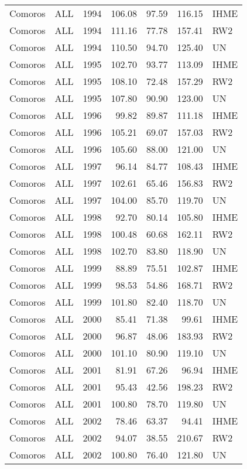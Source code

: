 \begin{longtable}{lllrrrl}
  Comoros & ALL & 1994 & 106.08 & 97.59 & 116.15 & IHME \\ 
  Comoros & ALL & 1994 & 111.16 & 77.78 & 157.41 & RW2 \\ 
  Comoros & ALL & 1994 & 110.50 & 94.70 & 125.40 & UN \\ 
  Comoros & ALL & 1995 & 102.70 & 93.77 & 113.09 & IHME \\ 
  Comoros & ALL & 1995 & 108.10 & 72.48 & 157.29 & RW2 \\ 
  Comoros & ALL & 1995 & 107.80 & 90.90 & 123.00 & UN \\ 
  Comoros & ALL & 1996 & 99.82 & 89.87 & 111.18 & IHME \\ 
  Comoros & ALL & 1996 & 105.21 & 69.07 & 157.03 & RW2 \\ 
  Comoros & ALL & 1996 & 105.60 & 88.00 & 121.00 & UN \\ 
  Comoros & ALL & 1997 & 96.14 & 84.77 & 108.43 & IHME \\ 
  Comoros & ALL & 1997 & 102.61 & 65.46 & 156.83 & RW2 \\ 
  Comoros & ALL & 1997 & 104.00 & 85.70 & 119.70 & UN \\ 
  Comoros & ALL & 1998 & 92.70 & 80.14 & 105.80 & IHME \\ 
  Comoros & ALL & 1998 & 100.48 & 60.68 & 162.11 & RW2 \\ 
  Comoros & ALL & 1998 & 102.70 & 83.80 & 118.90 & UN \\ 
  Comoros & ALL & 1999 & 88.89 & 75.51 & 102.87 & IHME \\ 
  Comoros & ALL & 1999 & 98.53 & 54.86 & 168.71 & RW2 \\ 
  Comoros & ALL & 1999 & 101.80 & 82.40 & 118.70 & UN \\ 
  Comoros & ALL & 2000 & 85.41 & 71.38 & 99.61 & IHME \\ 
  Comoros & ALL & 2000 & 96.87 & 48.06 & 183.93 & RW2 \\ 
  Comoros & ALL & 2000 & 101.10 & 80.90 & 119.10 & UN \\ 
  Comoros & ALL & 2001 & 81.91 & 67.26 & 96.94 & IHME \\ 
  Comoros & ALL & 2001 & 95.43 & 42.56 & 198.23 & RW2 \\ 
  Comoros & ALL & 2001 & 100.80 & 78.70 & 119.80 & UN \\ 
  Comoros & ALL & 2002 & 78.46 & 63.37 & 94.41 & IHME \\ 
  Comoros & ALL & 2002 & 94.07 & 38.55 & 210.67 & RW2 \\ 
  Comoros & ALL & 2002 & 100.80 & 76.40 & 121.80 & UN \\ 

\end{longtable}
